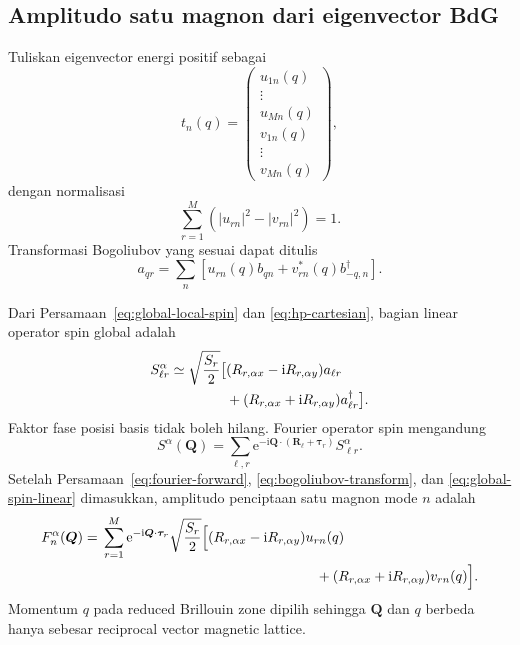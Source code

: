 \documentclass[11pt,a4paper]{article}
\newcommand{\ii}{\mathrm{i}}
\newcommand{\ee}{\mathrm{e}}
\newcommand{\vQ}{\bm Q}
\begin{document}
\subsection{Amplitudo satu magnon dari eigenvector BdG}

Tuliskan eigenvector energi positif sebagai
\begin{equation}
t_n(q)=
\begin{pmatrix}
u_{1n}(q)\\ \vdots\\u_{Mn}(q)\\
v_{1n}(q)\\ \vdots\\v_{Mn}(q)
\end{pmatrix},
\end{equation}
dengan normalisasi
\begin{equation}
\sum_{r=1}^M(|u_{rn}|^2-|v_{rn}|^2)=1.
\end{equation}
Transformasi Bogoliubov yang sesuai dapat ditulis
\begin{equation}
a_{qr}=\sum_n
\left[u_{rn}(q)b_{qn}+v_{rn}^*(q)b_{-q,n}^\dagger\right].
\label{eq:bogoliubov-transform}
\end{equation}

Dari Persamaan~\eqref{eq:global-local-spin} dan \eqref{eq:hp-cartesian}, bagian linear operator spin global adalah
\begin{align}
S_{\ell r}^\alpha\simeq\sqrt{\frac{S_r}{2}}
\big[&
(R_{r,\alpha x}-\ii R_{r,\alpha y})a_{\ell r}\notag\\
&+(R_{r,\alpha x}+\ii R_{r,\alpha y})a_{\ell r}^\dagger
\big].
\label{eq:global-spin-linear}
\end{align}
Faktor fase posisi basis tidak boleh hilang. Fourier operator spin mengandung
\begin{equation}
S^\alpha(\vQ)=\sum_{\ell,r}
\ee^{-\ii\vQ\cdot(\bm R_\ell+\bm\tau_r)}S_{\ell r}^\alpha.
\end{equation}
Setelah Persamaan~\eqref{eq:fourier-forward}, \eqref{eq:bogoliubov-transform}, dan \eqref{eq:global-spin-linear} dimasukkan, amplitudo penciptaan satu magnon mode $n$ adalah
\begin{align}
F_n^\alpha(\vQ)={}&
\sum_{r=1}^M\ee^{-\ii\vQ\cdot\bm\tau_r}
\sqrt{\frac{S_r}{2}}
\Big[
(R_{r,\alpha x}-\ii R_{r,\alpha y})u_{rn}(q)\notag\\
&\hspace{5.4cm}
+(R_{r,\alpha x}+\ii R_{r,\alpha y})v_{rn}(q)
\Big].
\label{eq:mode-amplitude}
\end{align}
Momentum $q$ pada reduced Brillouin zone dipilih sehingga $\vQ$ dan $q$ berbeda hanya sebesar reciprocal vector magnetic lattice.
\end{document}
